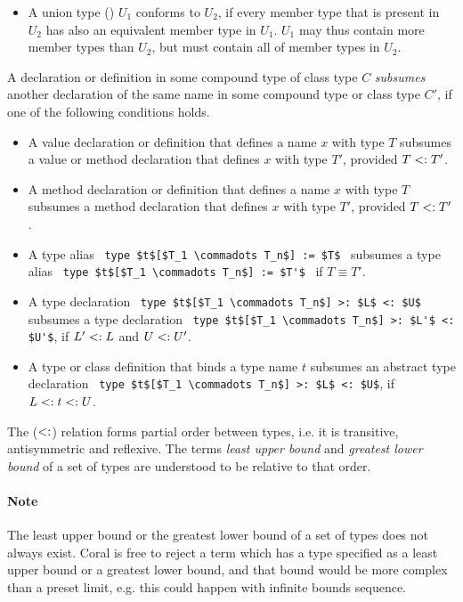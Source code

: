 \begin{itemize}
  \item A union type () $U_1$ conforms to $U_2$, if every member type that is present in $U_2$ has also an equivalent member type in $U_1$. $U_1$ may thus contain more member types than $U_2$, but must contain all of member types in $U_2$. 

\end{itemize}

A declaration or definition in some compound type of class type $C$ {\em subsumes} another declaration of the same name in some compound type or class type $C'$, if one of the following conditions holds. 
  \begin{itemize}
  \item A value declaration or definition that defines a name $x$ with type $T$ subsumes a value or method declaration that defines $x$ with type $T'$, provided $T <: T'$. 
  \item A method declaration or definition that defines a name $x$ with type $T$ subsumes a method declaration that defines $x$ with type $T'$, provided $T <: T'$. 
  \item A type alias ~\lstinline!type $t$[$T_1 \commadots T_n$] := $T$!~ subsumes a type alias ~\lstinline!type $t$[$T_1 \commadots T_n$] := $T'$!~ if $T \equiv T'$. 
  \item A type declaration ~\lstinline!type $t$[$T_1 \commadots T_n$] >: $L$ <: $U$!~ subsumes a type declaration ~\lstinline!type $t$[$T_1 \commadots T_n$] >: $L'$ <: $U'$!, if $L' <: L$ and $U <: U'$. 
  \item A type or class definition that binds a type name $t$ subsumes an abstract type declaration ~\lstinline!type $t$[$T_1 \commadots T_n$] >: $L$ <: $U$!, if $L <: t <: U$. 
  \end{itemize}

The ($<:$) relation forms partial order between types, i.e. it is transitive, antisymmetric and reflexive. The terms {\em least upper bound} and {\em greatest lower bound} of a set of types are understood to be relative to that order. 

\paragraph{Note}
The least upper bound or the greatest lower bound of a set of types does not always exist. Coral is free to reject a term which has a type specified as a least upper bound or a greatest lower bound, and that bound would be more complex than a preset limit, e.g. this could happen with infinite bounds sequence. 

